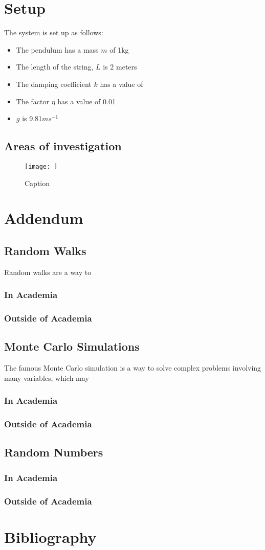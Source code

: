 \documentclass[12pt]{article}
\begin{document}
\section{Setup}
The system is set up as follows:
\begin{itemize}
    \item The pendulum has a mass $m$ of 1kg
    \item The length of the string, $L$ is 2 meters
    \item The damping coefficient $k$ has a value of 
    \item The factor $\eta$ has a value of 0.01
    \item $g$ is 9.81$ms^{-1}$
\end{itemize}

\subsection{Areas of investigation}
\begin{figure}
    \centering
    \texttt{[image: ]}
    \caption{Caption}
    \label{fig:enter-label}
\end{figure}

\section{Addendum}
\subsection{Random Walks}
Random walks are a way to 
\subsubsection{In Academia}
\subsubsection{Outside of Academia}
\subsection{Monte Carlo Simulations}
The famous Monte Carlo simulation is a way to solve complex problems involving many variables, which may
\subsubsection{In Academia}
\subsubsection{Outside of Academia}


\subsection{Random Numbers}
\subsubsection{In Academia}
\subsubsection{Outside of Academia}

\newpage
\section{Bibliography}


\end{document}
